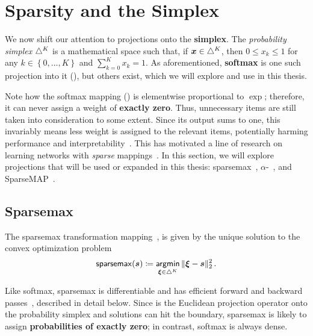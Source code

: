 \section{Sparsity and the Simplex}
\label{sec:sparsity_background}


\noindent We now shift our attention to projections onto the \textbf{simplex}. The
\textit{probability simplex} $\triangle^K$ is a mathematical space
such that, if $\bm{x}\in\triangle^K$, then $0 \leq x_k \leq 1$ for any
$k\in\left\{0, \dots, K\right\}$ and $\sum_{k=0}^K x_k = 1$. As
aforementioned, \textbf{softmax} is one such projection into it
(), but others exist, which we will explore and use in this thesis.

Note how the softmax mapping () is elementwise
proportional to $\exp$; therefore, it can never assign a weight of
\textbf{exactly zero}. Thus, unnecessary items are still taken into
consideration to some extent. Since its output sums to one, this
invariably means less weight is assigned to the relevant items,
potentially harming performance and
interpretability~\citep{jain2019attention}. This has motivated a line
of research on learning networks with \emph{sparse}
mappings~\citep{sparsemax,fusedmax,louizos,shao2019ssn}. In this
section, we will explore projections that will be used or expanded in
this thesis: sparsemax~\citep{martins2016softmax},
$\alpha$-\entmaxtext~\citep{blondel2019learning,entmax}, and
SparseMAP~\cite{niculae2018sparsemap}.

\subsection{Sparsemax}\label{sec:sparsemax_bg}

\noindent The sparsemax transformation
mapping~\citep{martins2016softmax}, is given by the unique solution
to the convex optimization problem
%
\begin{equation}\label{eq:sparsemax}
    \operatorname*{\mathsf{sparsemax}}(\bm{s}) \coloneqq \operatorname*{\mathsf{argmin}}_{\bm{\xi} \in \triangle^K} \| \bm{\xi} - \bm{s} \|_2^2\,.
\end{equation}

Like softmax, sparsemax is differentiable and has efficient forward and backward
passes~\citep{Held1974,martins2016softmax}, described in detail below. Since
 is the Euclidean projection operator onto the probability
simplex and solutions can hit the boundary, sparsemax is likely to assign {\bf
        probabilities of exactly zero}; in contrast, softmax is always dense.

